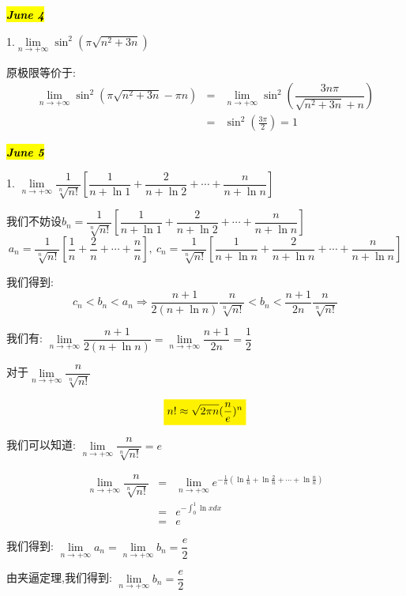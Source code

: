 
\hl{\textbf{\textit{June 4}}}

1.$\lim\limits_{n\rightarrow+\infty}\sin^{2}(\pi\sqrt{n^2+3n})$
\begin{solution}
	
	原极限等价于: 
	\begin{eqnarray*}
		\lim\limits_{n\rightarrow+\infty}\sin^{2}(\pi\sqrt{n^2+3n}-\pi n)&=&\lim\limits_{n\rightarrow+\infty}\sin^{2}(\dfrac{3n\pi }{\sqrt{n^2+3n}+n})\\
		&=&\sin^2(\frac{3\pi}{2})=1
	\end{eqnarray*}
	
\end{solution}


\hl{\textbf{\textit{June 5}}}

1. $\lim\limits_{n\rightarrow +\infty}\dfrac{1}{\sqrt[n]{n!}}\left[\dfrac{1}{n+\ln 1}+\dfrac{2}{n+\ln 2}+\cdots+\dfrac{n}{n+\ln n} \right]$
\begin{solution}
	
	我们不妨设$b_{n}=\dfrac{1}{\sqrt[n]{n!}}\left[\dfrac{1}{n+\ln 1}+\dfrac{2}{n+\ln 2}+\cdots+\dfrac{n}{n+\ln n} \right]$
	$$a_{n}=\dfrac{1}{\sqrt[n]{n!}}[\frac{1}{n}+\frac{2}{n}+\cdots+\frac{n}{n}],\ c_{n}=\dfrac{1}{\sqrt[n]{n!}}[\frac{1}{n+\ln n}+\frac{2}{n+\ln n}+\cdots+\frac{n}{n+\ln n}]$$
	
	我们得到: 
	$$c_{n}<b_{n}<a_{n}\Rightarrow \dfrac{n+1}{2(n+\ln n)}\dfrac{n}{\sqrt[n]{n!}}<b_{n}<\dfrac{n+1}{2n}\dfrac{n}{\sqrt[n]{n!}}$$
	
	我们有: $\lim\limits_{n\rightarrow +\infty}\dfrac{n+1}{2(n+\ln n)}=\lim\limits_{n\rightarrow +\infty}\dfrac{n+1}{2n}=\dfrac{1}{2}$
	
	对于$\lim\limits_{n\rightarrow +\infty}\dfrac{n}{\sqrt[n]{n!}}$
	\begin{lemma}[斯特林公式]\label{lem: 斯特林公式}
		$$\mathcolorbox{yellow}{n!\approx \sqrt{2\pi n}(\dfrac{n}{e})^n}$$
		
	\end{lemma}
	我们可以知道: $\lim\limits_{n\rightarrow +\infty}\dfrac{n}{\sqrt[n]{n!}}=e$
	\begin{anymark}[注]
		\begin{eqnarray*}
			\lim\limits_{n\rightarrow +\infty}\dfrac{n}{\sqrt[n]{n!}}
			&=&\lim\limits_{n\rightarrow +\infty}e^{-\frac{1}{n}(\ln\frac{1}{n}+\ln\frac{2}{n}+\cdots+\ln\frac{n}{n})}\\
			&=&e^{-\int_{0}^{1}\ln x dx}\\
			&=&e
		\end{eqnarray*}
	\end{anymark}
	我们得到: $\lim\limits_{n\rightarrow +\infty}a_{n}=\lim\limits_{n\rightarrow +\infty}b_{n}=\dfrac{e}{2}$
	
	由夹逼定理,我们得到: $\lim\limits_{n\rightarrow +\infty}b_{n}=\dfrac{e}{2}$
\end{solution}

